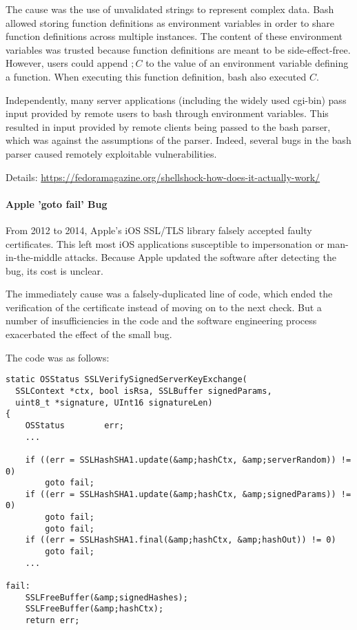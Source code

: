 The cause was the use of unvalidated strings to represent complex data.
Bash allowed storing function definitions as environment variables in order to share function definitions across multiple instances.
The content of these environment variables was trusted because function definitions are meant to be side-effect-free.
However, users could append $; C$ to the value of an environment variable defining a function.
When executing this function definition, bash also executed $C$.


Independently, many server applications (including the widely used cgi-bin) pass input provided by remote users to bash through environment variables.
This resulted in input provided by remote clients being passed to the bash parser, which was against the assumptions of the parser.
Indeed, several bugs in the bash parser caused remotely exploitable vulnerabilities.

Details: \url{https://fedoramagazine.org/shellshock-how-does-it-actually-work/}

\paragraph{Apple 'goto fail' Bug}
From 2012 to 2014, Apple's iOS SSL/TLS library falsely accepted faulty certificates.
This left most iOS applications susceptible to impersonation or man-in-the-middle attacks.
Because Apple updated the software after detecting the bug, its cost is unclear.

The immediately cause was a falsely-duplicated line of code, which ended the verification of the certificate instead of moving on to the next check.
But a number of insufficiencies in the code and the software engineering process exacerbated the effect of the small bug.

The code was as follows:

\begin{lstlisting}
static OSStatus SSLVerifySignedServerKeyExchange(
  SSLContext *ctx, bool isRsa, SSLBuffer signedParams,
  uint8_t *signature, UInt16 signatureLen)
{
	OSStatus        err;
	...

	if ((err = SSLHashSHA1.update(&amp;hashCtx, &amp;serverRandom)) != 0)
		goto fail;
	if ((err = SSLHashSHA1.update(&amp;hashCtx, &amp;signedParams)) != 0)
		goto fail;
		goto fail;
	if ((err = SSLHashSHA1.final(&amp;hashCtx, &amp;hashOut)) != 0)
		goto fail;
	...

fail:
	SSLFreeBuffer(&amp;signedHashes);
	SSLFreeBuffer(&amp;hashCtx);
	return err;
\end{lstlisting}

